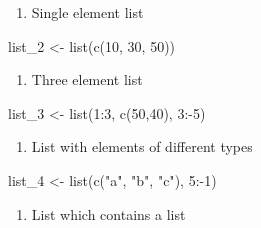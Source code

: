 \documentclass[
  letterpaper,
  DIV=11,
  numbers=noendperiod]{scrreprt}
\newenvironment{Shaded}{\begin{snugshade}}{\end{snugshade}}
\newcommand{\DecValTok}[1]{\textcolor[rgb]{0.68,0.00,0.00}{#1}}
\newcommand{\FunctionTok}[1]{\textcolor[rgb]{0.28,0.35,0.67}{#1}}
\newcommand{\NormalTok}[1]{\textcolor[rgb]{0.00,0.23,0.31}{#1}}
\newcommand{\OtherTok}[1]{\textcolor[rgb]{0.00,0.23,0.31}{#1}}
\newcommand{\SpecialCharTok}[1]{\textcolor[rgb]{0.37,0.37,0.37}{#1}}
\newcommand{\StringTok}[1]{\textcolor[rgb]{0.13,0.47,0.30}{#1}}
\providecommand{\tightlist}{%
  \setlength{\itemsep}{0pt}\setlength{\parskip}{0pt}}\usepackage{longtable,booktabs,array}
\begin{document}
\begin{enumerate}
\def\labelenumi{\alph{enumi}.}
\setcounter{enumi}{1}
\tightlist
\item
  Single element list
\end{enumerate}

\begin{Shaded}
\begin{Highlighting}[]
\NormalTok{list\_2 }\OtherTok{\textless{}{-}} \FunctionTok{list}\NormalTok{(}\FunctionTok{c}\NormalTok{(}\DecValTok{10}\NormalTok{, }\DecValTok{30}\NormalTok{, }\DecValTok{50}\NormalTok{))}
\end{Highlighting}
\end{Shaded}

\begin{enumerate}
\def\labelenumi{\alph{enumi}.}
\setcounter{enumi}{2}
\tightlist
\item
  Three element list
\end{enumerate}

\begin{Shaded}
\begin{Highlighting}[]
\NormalTok{list\_3 }\OtherTok{\textless{}{-}} \FunctionTok{list}\NormalTok{(}\DecValTok{1}\SpecialCharTok{:}\DecValTok{3}\NormalTok{, }\FunctionTok{c}\NormalTok{(}\DecValTok{50}\NormalTok{,}\DecValTok{40}\NormalTok{), }\DecValTok{3}\SpecialCharTok{:{-}}\DecValTok{5}\NormalTok{)}
\end{Highlighting}
\end{Shaded}

\begin{enumerate}
\def\labelenumi{\alph{enumi}.}
\setcounter{enumi}{3}
\tightlist
\item
  List with elements of different types
\end{enumerate}

\begin{Shaded}
\begin{Highlighting}[]
\NormalTok{list\_4 }\OtherTok{\textless{}{-}} \FunctionTok{list}\NormalTok{(}\FunctionTok{c}\NormalTok{(}\StringTok{"a"}\NormalTok{, }\StringTok{"b"}\NormalTok{, }\StringTok{"c"}\NormalTok{), }\DecValTok{5}\SpecialCharTok{:{-}}\DecValTok{1}\NormalTok{)}
\end{Highlighting}
\end{Shaded}

\begin{enumerate}
\def\labelenumi{\alph{enumi}.}
\setcounter{enumi}{4}
\tightlist
\item
  List which contains a list
\end{enumerate}
\end{document}
